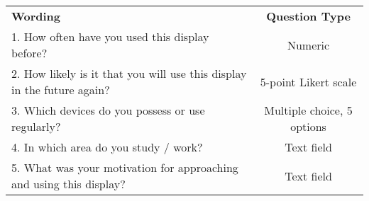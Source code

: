 \begin{tabular}{lc}
\textbf{Wording}                                                     & \textbf{Question Type} \\ %
1. How often have you used this display before?                         & Numeric                \\
2. How likely is it that you will use this display in the future again? & 5-point Likert scale   \\
3. Which devices do you possess or use regularly?                       & Multiple choice, 5 options                        \\
4. In which area do you study / work?                                   & Text field             \\
5. What was your motivation for approaching and using this display?     & Text field            
\end{tabular}
